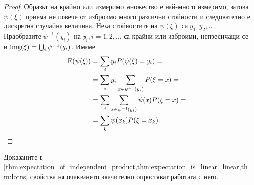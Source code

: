 \documentclass{../../common/topic}
\begin{document}
\begin{proof}
  Образът на крайно или измеримо множество е най-много измеримо, затова \( \psi(\xi) \) приема не повече от изброимо много различни стойности и следователно е дискретна случайна величина. Нека стойностите на \( \psi(\xi) \) са \( y_1, y_2, \ldots \) Праобразите \( \psi^{-1}(y_i) \) на \( y_i, i = 1, 2, \ldots \) са крайни или изброими, непресичащи се и \( \operatorname{img}(\xi) = \bigcup_i \psi^{-1}(y_i) \). Имаме
  \begin{align*}
    \operatorname{E}(\psi(\xi))
    &=
    \sum_i y_i P(\psi(\xi) = y_i)
    = \\ &=
    \sum_i y_i \sum_{x \in \psi^{-1}(y_i)} P(\xi = x)
    = \\ &=
    \sum_i \sum_{x \in \psi^{-1}(y_i)} \psi(x) P(\xi = x)
    = \\ &=
    \sum_k \psi(x_k) P(\xi = x_k).
  \end{align*}
\end{proof}

Доказаните в \cref{thm:expectation_of_independent_product,thm:expectation_is_linear_linear,thm:lotus} свойства на очакването значително опростяват работата с него.
\end{document}
